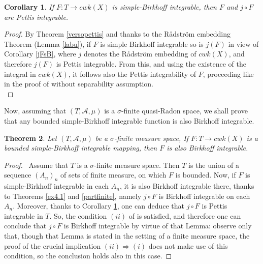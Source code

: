 \documentclass[11pt,a4paper,twoside]{amsart}
\newtheorem{theorem}{Theorem}[section]
\newtheorem{corollary}[theorem]{Corollary}
\begin{document}
\begin{corollary}\label{jFP}
If $F:T\to cwk(X)$ is simple-Birkhoff integrable,
then $F$ and $j \circ F$ are Pettis integrable.
\end{corollary}
\begin{proof}
By Theorem \ref{versopettis} and thanks to the R{\aa}dstr\"{o}m embedding Theorem (Lemma  \ref{labu}), if $F$ is simple Birkhoff integrable
 so is $j(F)$ in view of Corollary \ref{jFsB}, where $j$ denotes the R{\aa}dstr\"{o}m embedding of $cwk(X)$, and therefore $j(F)$ is Pettis integrable. From this, and using the existence of the integral in $cwk(X)$, it follows also the Pettis integrability of $F$, proceeding like in the proof of \cite[Proposition 3.5]{cr2004} without separability assumption.\\
\end{proof}

Now, assuming that $(T,\mathcal{A},\mu)$ is a $\sigma$-finite quasi-Radon space, we shall prove that any bounded simple-Birkhoff integrable function is also Birkhoff integrable.
\begin{theorem}\label{mainequiv}
Let $(T,\mathcal{A},\mu)$ be a $\sigma$-finite 
measure space, 
If $F:T\to cwk(X)$ is a bounded simple-Birkhoff integrable mapping, then $F$ is also Birkhoff integrable.
\end{theorem}
\begin{proof}\
Assume that 
$T$ is a $\sigma$-finite measure space. Then $T$ is the union of a sequence $(A_n)_n$ of sets of finite measure, on which $F$ is bounded.
 Now, if $F$ is simple-Birkhoff integrable in each $A_n$, it is also Birkhoff integrable there, thanks to Theorems \ref{ex4.1} and \ref{partfinite}, namely $j \circ F$ is Birkhoff integrable on each $A_n$.
Moreover,  thanks to Corollary \ref{jFP},
one can deduce that $j \circ F$ is Pettis integrable in $T$. So, the condition $(ii)$ of \cite[Lemma 3.2]{cr2005} is satisfied, and therefore one can conclude that $j\circ F$ is Birkhoff integrable by virtue of that Lemma:
observe only that, though that Lemma is stated in the setting of a finite measure space, the proof of the crucial implication $(ii)\Rightarrow (i)$ does not make use of this condition, so the conclusion holds also in this case.
\end{proof}
\end{document}
